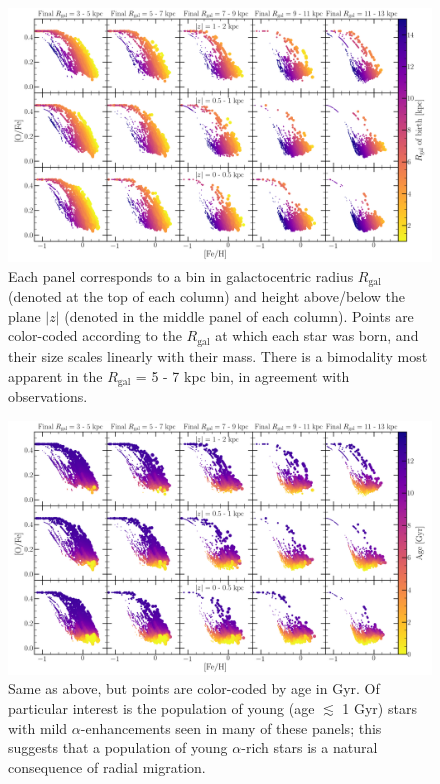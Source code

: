 \documentclass[12pt]{report}
\begin{document}
\begin{figure}[!h] 
\centering 
\includegraphics[scale = 0.3]{../plots/rgal_birth/hayden2015plot/moddisk_vigorousSF.png} 
\caption{Each panel corresponds to a bin in galactocentric radius 
$R_\text{gal}$ (denoted at the top of each column) and height above/below the 
plane $\left|z\right|$ (denoted in the middle panel of each column). Points 
are color-coded according to the $R_\text{gal}$ at which each star was born, 
and their size scales linearly with their mass. There is a bimodality most 
apparent in the $R_\text{gal}$ = 5 - 7 kpc bin, in agreement with 
observations.} 
\end{figure} 

\begin{figure}[!h] 
\centering 
\includegraphics[scale = 0.3]{../plots/age/hayden2015plot/moddisk_vigorousSF.png}
\caption{
Same as above, but points are color-coded by age in Gyr. Of particular 
interest is the population of young (age $\lesssim$ 1 Gyr) stars with mild 
$\alpha$-enhancements seen in many of these panels; this suggests that a 
population of young $\alpha$-rich stars is a natural consequence of radial 
migration. 
} 
\end{figure} 
\end{document}

